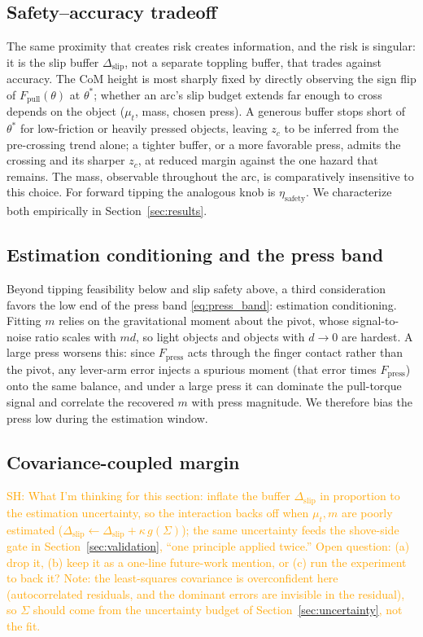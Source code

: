 \documentclass[10pt, conference]{IEEEtran}
\newcommand{\sh}[1]{\textcolor{orange}{SH: #1}}
\begin{document}
\subsection{Safety--accuracy tradeoff}
The same proximity that creates risk creates information, and the risk is singular: it is the slip buffer $\Delta_{\mathrm{slip}}$, not a separate toppling buffer, that trades against accuracy. The CoM height is most sharply fixed by directly observing the sign flip of $F_{\mathrm{pull}}(\theta)$ at $\theta^{*}$; whether an arc's slip budget extends far enough to cross depends on the object ($\mu_t$, mass, chosen press). A generous buffer stops short of $\theta^{*}$ for low-friction or heavily pressed objects, leaving $z_c$ to be inferred from the pre-crossing trend alone; a tighter buffer, or a more favorable press, admits the crossing and its sharper $z_c$, at reduced margin against the one hazard that remains. The mass, observable throughout the arc, is comparatively insensitive to this choice. For forward tipping the analogous knob is $\eta_{\mathrm{safety}}$. We characterize both empirically in Section~\ref{sec:results}.

\subsection{Estimation conditioning and the press band} \label{sec:conditioning}
Beyond tipping feasibility below and slip safety above, a third consideration favors the low end of the press band \eqref{eq:press_band}: estimation conditioning. Fitting $m$ relies on the gravitational moment about the pivot, whose signal-to-noise ratio scales with $m d$, so light objects and objects with $d \to 0$ are hardest. A large press worsens this: since $F_{\mathrm{press}}$ acts through the finger contact rather than the pivot, any lever-arm error injects a spurious moment (that error times $F_{\mathrm{press}}$) onto the same balance, and under a large press it can dominate the pull-torque signal and correlate the recovered $m$ with press magnitude. We therefore bias the press low during the estimation window.

\subsection{Covariance-coupled margin}
\sh{What I'm thinking for this section: inflate the buffer $\Delta_{\mathrm{slip}}$ in proportion to the estimation uncertainty, so the interaction backs off when $\mu_t, m$ are poorly estimated ($\Delta_{\mathrm{slip}} \leftarrow \Delta_{\mathrm{slip}} + \kappa\,g(\Sigma)$); the same uncertainty feeds the shove-side gate in Section~\ref{sec:validation}, ``one principle applied twice.'' Open question: (a) drop it, (b) keep it as a one-line future-work mention, or (c) run the experiment to back it? Note: the least-squares covariance is overconfident here (autocorrelated residuals, and the dominant errors are invisible in the residual), so $\Sigma$ should come from the uncertainty budget of Section~\ref{sec:uncertainty}, not the fit.}
\end{document}
